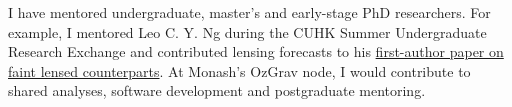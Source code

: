 \documentclass[11pt]{article}
\begin{document}
I have mentored undergraduate, master's and early-stage PhD researchers. For example, I mentored Leo C. Y. Ng during the CUHK Summer Undergraduate Research Exchange and contributed lensing forecasts to his \href{https://doi.org/10.1093/mnras/staf874}{first-author paper on faint lensed counterparts}. At Monash's OzGrav node, I would contribute to shared analyses, software development and postgraduate mentoring.
\end{document}
